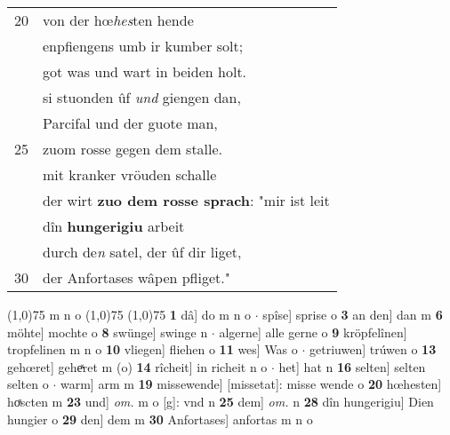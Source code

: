 \documentclass[8pt,a4paper,notitlepage]{article}
\begin{document}
\begin{table}[ht]
\begin{minipage}[t]{0.5\linewidth}
\begin{tabular}{rl}
20 & von der hœ\textit{hes}ten hende\\ 
 & enpfiengens umb ir kumber solt;\\ 
 & got was und wart in beiden holt.\\ 
 & si stuonden ûf \textit{und} giengen dan,\\ 
 & Parcifal und der guote man,\\ 
25 & zuom rosse gegen dem stalle.\\ 
 & mit kranker vröuden schalle\\ 
 & der wirt \textbf{zuo dem rosse sprach}: "mir ist leit\\ 
 & dîn \textbf{hungerigiu} arbeit\\ 
 & durch de\textit{n} satel, der ûf dir liget,\\ 
30 & der Anfortases wâpen pfliget."\\ 
\end{tabular}
\scriptsize
\line(1,0){75} \newline
m n o \newline
\line(1,0){75} \newline
\newline
\line(1,0){75} \newline
\textbf{1} dâ] do m n o  $\cdot$ spîse] sprise o \textbf{3} an den] dan m \textbf{6} möhte] mochte o \textbf{8} swünge] swinge n  $\cdot$ algerne] alle gerne o \textbf{9} kröpfelînen] tropfelinen m n o \textbf{10} vliegen] fliehen o \textbf{11} wes] Was o  $\cdot$ getriuwen] trúwen o \textbf{13} gehœret] geheͯret m (o) \textbf{14} rîcheit] in richeit n o  $\cdot$ het] hat n \textbf{16} selten] selten selten o  $\cdot$ warm] arm m \textbf{19} missewende] [missetat]: misse wende o \textbf{20} hœhesten] hoͯscten m \textbf{23} und] \textit{om.} m o [g]: vnd n \textbf{25} dem] \textit{om.} n \textbf{28} dîn hungerigiu] Dien hungier o \textbf{29} den] dem m \textbf{30} Anfortases] anfortas m n o \newline
\end{minipage}
\end{table}
\newpage
\end{document}
